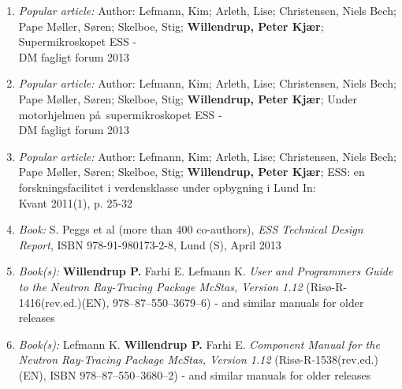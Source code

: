 \begin{enumerate}
\item{\emph{Popular article:} Author: Lefmann, Kim; Arleth, Lise; Christensen, Niels Bech;
    Pape M\o ller, S\o ren; Skelboe, Stig; {\bf Willendrup, Peter
      Kj\ae r}; Supermikroskopet ESS -
    \\DM  fagligt
      forum 2013}
  \item{\emph{Popular article:} Author: Lefmann, Kim; Arleth, Lise; Christensen, Niels Bech;
    Pape M\o ller, S\o ren; Skelboe, Stig; {\bf Willendrup, Peter
      Kj\ae r}; Under motorhjelmen p\aa\ supermikroskopet ESS -
    \\DM  fagligt forum 2013}
  \item{\emph{Popular article:} Author: Lefmann, Kim; Arleth, Lise; Christensen, Niels Bech;
    Pape M\o ller, S\o ren; Skelboe, Stig; {\bf Willendrup, Peter
      Kj\ae r}; ESS: en forskningsfacilitet i verdensklasse under
    opbygning i Lund In: \\Kvant 2011(1), p. 25-32}
  \item{\emph{Book:} S. Peggs et al (more than 400 co-authors), \emph{ESS Technical Design Report}, ISBN 978-91-980173-2-8, Lund (S), April 2013}
  \item{\emph{Book(s):} {\bf Willendrup P.} Farhi E. Lefmann K. \emph{User and Programmers
        Guide to the Neutron Ray-Tracing Package McStas, Version 1.12}
      (Ris\o-R-1416(rev.ed.)(EN), 978--87--550--3679--6) - and similar manuals for older releases}
  \item{\emph{Book(s):} Lefmann K. {\bf Willendrup P.} Farhi E. \emph{Component Manual for the Neutron Ray-Tracing Package McStas, Version 1.12}
      (Ris\o-R-1538(rev.ed.)(EN), ISBN 978--87--550--3680--2) - and similar manuals for older releases}
  \end{enumerate}

